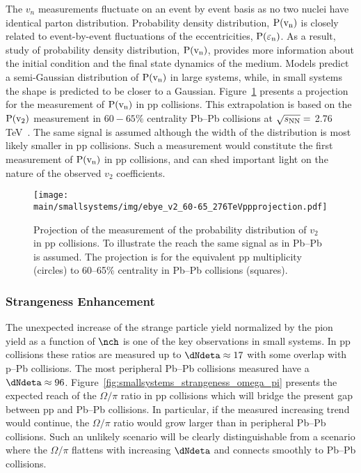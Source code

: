 \documentclass[../report.tex]{subfiles}
\providecommand{\main}{..}
\begin{document}
The $v_n$ measurements fluctuate on an event by event basis as no two nuclei have identical parton distribution. Probability density distribution, $\rm{P}(v_n)$ is closely related to event-by-event fluctuations of the eccentricities, $\rm{P}(\varepsilon_{n})$. As a result,  
study of probability density distribution, $\rm{P}(v_n)$,  provides more information about the initial condition and the final state dynamics of the medium. Models predict a semi-Gaussian distribution of $\rm{P}(v_{n})$ in large systems, while, in small systems the shape is predicted to be closer to a Gaussian. Figure~\ref{fig:smallsystems_corr_pvn} presents a projection for the measurement of $\rm{P}(v_n)$ in pp collisions. This extrapolation is based on the $\rm{P}(v_{2})$ measurement in $60-65\%$ centrality Pb--Pb collisions at $\sqrt{s_{\rm{NN}}} = $ 2.76 TeV~\cite{Aad:2013xma}. The same signal is assumed although the width of the distribution is most likely smaller in pp collisions. Such a measurement would constitute the first measurement of $\rm{P}(v_{n})$ in pp collisions, and can shed important light on the nature of the observed $v_2$ coefficients.

\begin{figure}[ht]
\centering
\texttt{[image: \\main/smallsystems/img/ebye\_v2\_60-65\_276TeVppprojection.pdf]}

\caption{Projection of the measurement of the probability distribution of $v_2$ in pp collisions. To illustrate the reach the same signal as in Pb--Pb~\cite{Aad:2013xma} is assumed. The projection is for the equivalent pp multiplicity (circles) to 60--65\% centrality in Pb--Pb collisions (squares).}
\label{fig:smallsystems_corr_pvn}
\end{figure}

\subsubsection{Strangeness Enhancement}

The unexpected increase of the strange particle yield normalized by the pion yield as a function of $\nch$ is one of the key observations in small systems. In pp collisions these ratios are measured up to $\dNdeta \approx 17$ with some overlap with p--Pb collisions. The most peripheral Pb--Pb collisions measured have a $\dNdeta \approx 96$. Figure~\ref{fig:smallsystems_strangeness_omega_pi} presents the expected reach of the $\Omega/\pi$ ratio in pp collisions which will bridge the present gap between pp and Pb--Pb collisions. In particular, if the measured increasing trend would continue, the $\Omega/\pi$ ratio would grow larger than in peripheral Pb--Pb collisions. Such an unlikely scenario will be clearly distinguishable from a scenario where the $\Omega/\pi$ flattens with increasing $\dNdeta$ and connects smoothly to Pb--Pb collisions. 
\end{document}
